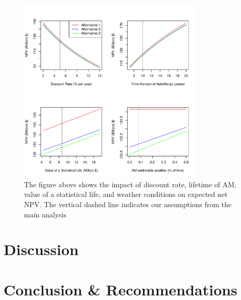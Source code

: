 \documentclass[11pt, letterpaper]{article}
\begin{document}
\begin{figure}[h]
\centering
\includegraphics[width=0.8\textwidth]{../../R/sensitivity.pdf}
\caption{The figure above shows the impact of discount rate, lifetime
  of AM, value of a statistical life, and weather conditions on
  expected net NPV.  The vertical dashed line indicates our
  assumptions from the main analysis}
\label{fig:sensitivity}
\end{figure}

\section{Discussion} \label{discussion}


\section{Conclusion \& Recommendations} \label{conclusion}


\pagebreak
\pagebreak
\begin{multicols}{2}
\printbibliography[heading=none]
\end{multicols}
\end{document}
